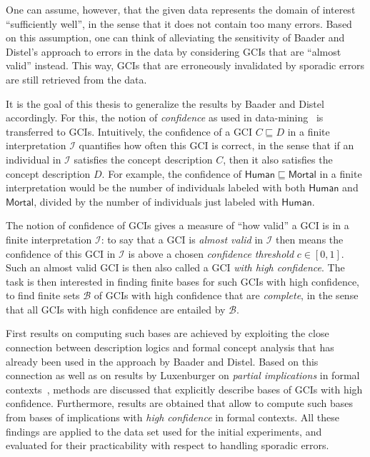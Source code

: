 \documentclass[english,fleqn]{scrartcl}
\begin{document}
One can assume, however, that the given data represents the domain of interest
\enquote{sufficiently well}, in the sense that it does not contain too many errors.  Based
on this assumption, one can think of alleviating the sensitivity of Baader and Distel's
approach to errors in the data by considering GCIs that are \enquote{almost valid}
instead.  This way, GCIs that are erroneously invalidated by sporadic errors are still
retrieved from the data.

It is the goal of this thesis to generalize the results by Baader and Distel accordingly.
For this, the notion of \emph{confidence} as used in
data-mining~\cite{arules:agrawal:association-rules} is transferred to GCIs.  Intuitively,
the confidence of a GCI $C \sqsubseteq D$ in a finite interpretation $\mathcal{I}$
quantifies how often this GCI is correct, in the sense that if an individual in
$\mathcal{I}$ satisfies the concept description $C$, then it also satisfies the concept
description $D$.  For example, the confidence of $\mathsf{Human} \sqsubseteq
\mathsf{Mortal}$ in a finite interpretation would be the number of individuals labeled
with both $\mathsf{Human}$ and $\mathsf{Mortal}$, divided by the number of individuals
just labeled with $\mathsf{Human}$.

The notion of confidence of GCIs gives a measure of \enquote{how valid} a GCI is in a
finite interpretation $\mathcal{I}$: to say that a GCI is \emph{almost valid} in
$\mathcal{I}$ then means the confidence of this GCI in $\mathcal{I}$ is above a chosen
\emph{confidence threshold} $c \in [0,1]$.  Such an almost valid GCI is then also called a
GCI \emph{with high confidence}.  The task is then interested in finding finite bases for
such GCIs with high confidence, \ie to find finite sets $\mathcal{B}$ of GCIs with high
confidence that are \emph{complete}, in the sense that all GCIs with high confidence are
entailed by $\mathcal{B}$.

First results on computing such bases are achieved by exploiting the close connection
between description logics and formal concept analysis that has already been used in the
approach by Baader and Distel.  Based on this connection as well as on results by
Luxenburger on \emph{partial implications} in formal contexts~\cite{diss:Luxenburger},
methods are discussed that explicitly describe bases of GCIs with high confidence.
Furthermore, results are obtained that allow to compute such bases from bases of
implications with \emph{high confidence} in formal contexts.  All these findings are
applied to the data set used for the initial experiments, and evaluated for their
practicability with respect to handling sporadic errors.
\end{document}
